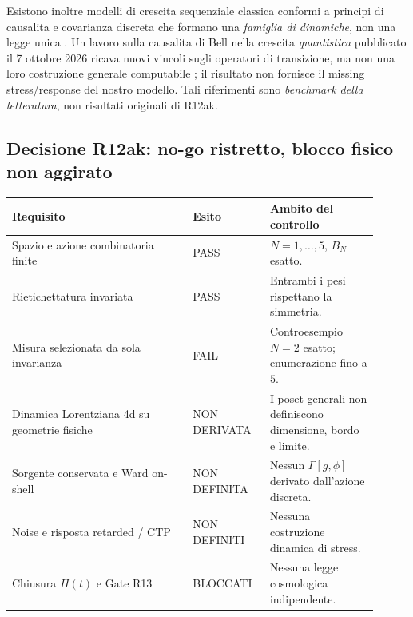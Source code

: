 \documentclass[11pt,a4paper]{article}
\newcommand{\status}[1]{\textsf{#1}}
\begin{document}
Esistono inoltre modelli di crescita sequenziale classica conformi a principi di causalita e covarianza discreta che formano una \emph{famiglia di dinamiche}, non una legge unica \cite{RideoutSorkin2000}. Un lavoro sulla causalita di Bell nella crescita \emph{quantistica} pubblicato il 7 ottobre 2026 ricava nuovi vincoli sugli operatori di transizione, ma non una loro costruzione generale computabile \cite{SrivastavaSurya2026}; il risultato non fornisce il missing stress/response del nostro modello. Tali riferimenti sono \emph{benchmark della letteratura}, non risultati originali di R12ak.

\subsection{Decisione R12ak: no-go ristretto, blocco fisico non aggirato}

\begin{center}\small
\begin{tabular}{p{0.45\linewidth}p{0.19\linewidth}p{0.27\linewidth}}
\toprule
\textbf{Requisito} & \textbf{Esito} & \textbf{Ambito del controllo}\\\midrule
Spazio e azione combinatoria finite & \status{PASS} & $N=1,\ldots,5$, $B_N$ esatto.\\
Rietichettatura invariata & \status{PASS} & Entrambi i pesi rispettano la simmetria.\\
Misura selezionata da sola invarianza & \status{FAIL} & Controesempio $N=2$ esatto; enumerazione fino a $5$.\\
Dinamica Lorentziana 4d su geometrie fisiche & \status{NON DERIVATA} & I poset generali non definiscono dimensione, bordo e limite.\\
Sorgente conservata e Ward on-shell & \status{NON DEFINITA} & Nessun $\Gamma[g,\phi]$ derivato dall'azione discreta.\\
Noise e risposta retarded / CTP & \status{NON DEFINITI} & Nessuna costruzione dinamica di stress.\\
Chiusura $H(t)$ e Gate R13 & \status{BLOCCATI} & Nessuna legge cosmologica indipendente.\\
\bottomrule
\end{tabular}
\end{center}
\end{document}
